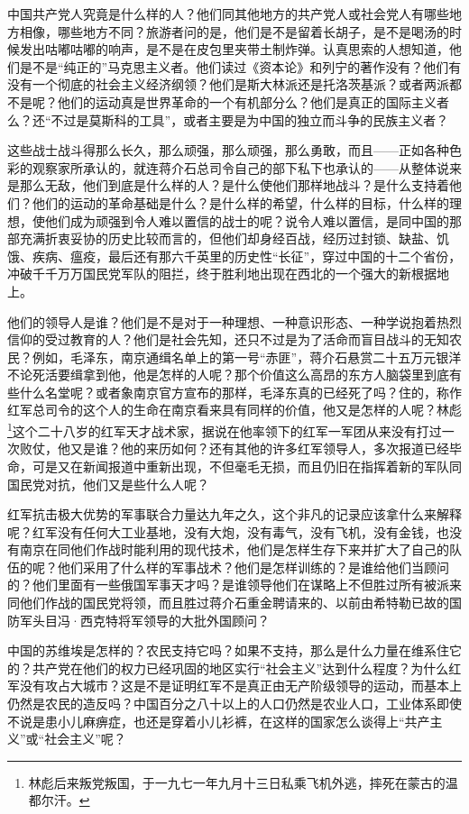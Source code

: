 \documentclass[10pt]{book}
\begin{document}
中国共产党人究竟是什么样的人？他们同其他地方的共产党人或社会党人有哪些地方相像，哪些地方不同？旅游者问的是，他们是不是留着长胡子，是不是喝汤的时候发出咕嘟咕嘟的响声，是不是在皮包里夹带土制炸弹。认真思索的人想知道，他们是不是“纯正的”马克思主义者。他们读过《资本论》和列宁的著作没有？他们有没有一个彻底的社会主义经济纲领？他们是斯大林派还是托洛茨基派？或者两派都不是呢？他们的运动真是世界革命的一个有机部分么？他们是真正的国际主义者么？还“不过是莫斯科的工具”，或者主要是为中国的独立而斗争的民族主义者？

这些战士战斗得那么长久，那么顽强，那么顽强，那么勇敢，而且——正如各种色彩的观察家所承认的，就连蒋介石总司令自己的部下私下也承认的——从整体说来是那么无敌，他们到底是什么样的人？是什么使他们那样地战斗？是什么支持着他们？他们的运动的革命基础是什么？是什么样的希望，什么样的目标，什么样的理想，使他们成为顽强到令人难以置信的战士的呢？说令人难以置信，是同中国的那部充满折衷妥协的历史比较而言的，但他们却身经百战，经历过封锁、缺盐、饥饿、疾病、瘟疫，最后还有那六千英里的历史性“长征”，穿过中国的十二个省份，冲破千千万万国民党军队的阻拦，终于胜利地出现在西北的一个强大的新根据地上。

他们的领导人是谁？他们是不是对于一种理想、一种意识形态、一种学说抱着热烈信仰的受过教育的人？他们是社会先知，还只不过是为了活命而盲目战斗的无知农民？例如，毛泽东，南京通缉名单上的第一号“赤匪”，蒋介石悬赏二十五万元银洋不论死活要缉拿到他，他是怎样的人呢？那个价值这么高昂的东方人脑袋里到底有些什么名堂呢？或者象南京官方宣布的那样，毛泽东真的已经死了吗？住的，称作红军总司令的这个人的生命在南京看来具有同样的价值，他又是怎样的人呢？林彪\footnote{林彪后来叛党叛国，于一九七一年九月十三日私乘飞机外逃，摔死在蒙古的温都尔汗。}这个二十八岁的红军天才战术家，据说在他率领下的红军一军团从来没有打过一次败仗，他又是谁？他的来历如何？还有其他的许多红军领导人，多次报道已经毕命，可是又在新闻报道中重新出现，不但毫毛无损，而且仍旧在指挥着新的军队同国民党对抗，他们又是些什么人呢？

红军抗击极大优势的军事联合力量达九年之久，这个非凡的记录应该拿什么来解释呢？红军没有任何大工业基地，没有大炮，没有毒气，没有飞机，没有金钱，也没有南京在同他们作战时能利用的现代技术，他们是怎样生存下来并扩大了自己的队伍的呢？他们采用了什么样的军事战术？他们是怎样训练的？是谁给他们当顾问的？他们里面有一些俄国军事天才吗？是谁领导他们在谋略上不但胜过所有被派来同他们作战的国民党将领，而且胜过蒋介石重金聘请来的、以前由希特勒已故的国防军头目冯·西克特将军领导的大批外国顾问？

中国的苏维埃是怎样的？农民支持它吗？如果不支持，那么是什么力量在维系住它的？共产党在他们的权力已经巩固的地区实行“社会主义”达到什么程度？为什么红军没有攻占大城市？这是不是证明红军不是真正由无产阶级领导的运动，而基本上仍然是农民的造反吗？中国百分之八十以上的人口仍然是农业人口，工业体系即使不说是患小儿麻痹症，也还是穿着小儿衫裤，在这样的国家怎么谈得上“共产主义”或“社会主义”呢？
\end{document}
